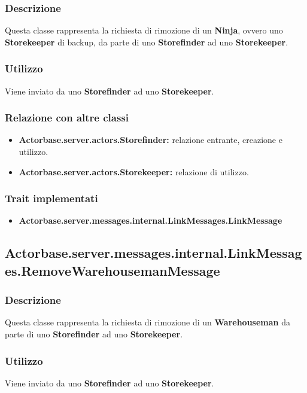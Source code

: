 \documentclass[a4paper]{article}
\begin{document}
			\subsubsection{Descrizione}
				Questa classe rappresenta la richiesta di rimozione di un \textbf{Ninja}, ovvero uno \textbf{Storekeeper} di backup, da 
				parte di uno \textbf{Storefinder} ad uno \textbf{Storekeeper}.
				
			\subsubsection{Utilizzo}
				Viene inviato da uno \textbf{Storefinder} ad uno \textbf{Storekeeper}.
				
			\subsubsection{Relazione con altre classi}
				\begin{itemize}
					\item \textbf{Actorbase.server.actors.Storefinder:} relazione entrante, creazione e utilizzo.
					\item \textbf{Actorbase.server.actors.Storekeeper:} relazione di utilizzo.
				\end{itemize}
				
			\subsubsection{Trait implementati}
				\begin{itemize}
					\item \textbf{Actorbase.server.messages.internal.LinkMessages.LinkMessage} 
				\end{itemize}
				
		\subsection{Actorbase.server.messages.internal.LinkMessages.RemoveWarehousemanMessage}
			\subsubsection{Descrizione}
				Questa classe rappresenta la richiesta di rimozione di un \textbf{Warehouseman} da parte di uno \textbf{Storefinder} 
				ad uno \textbf{Storekeeper}.
				
			\subsubsection{Utilizzo}
				Viene inviato da uno \textbf{Storefinder} ad uno \textbf{Storekeeper}.
				
\end{document}
